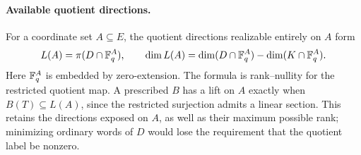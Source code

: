 \paragraph{Available quotient directions.}
For a coordinate set $A\subseteq E$, the quotient directions realizable
entirely on $A$ form
\[
 L(A)=\pi(D\cap\mathbb F_q^A),\qquad
 \dim L(A)=\dim(D\cap\mathbb F_q^A)-\dim(K\cap\mathbb F_q^A).
\]
Here $\mathbb F_q^A$ is embedded by zero-extension.  The formula is rank--nullity
for the restricted quotient map.  A prescribed $B$ has a lift on $A$
exactly when $B(T)\subseteq L(A)$, since the restricted surjection admits
a linear section.  This retains the directions exposed on $A$, as well as
their maximum possible rank; minimizing ordinary words of $D$ would lose
the requirement that the quotient label be nonzero.
